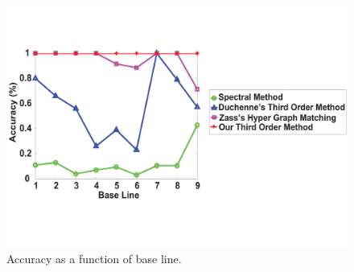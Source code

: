 \begin{figure}[!t]
\setlength{\abovecaptionskip}{0mm}
\setlength{\belowcaptionskip}{-2mm}
\centering
     \includegraphics[width=130mm]{EXP3_ERROR_RATE_embedded2.pdf}%
     \caption{Accuracy as a function of base line.}
\label{fig:mini:projection_matchingaccuracy} %
\end{figure}%
%
